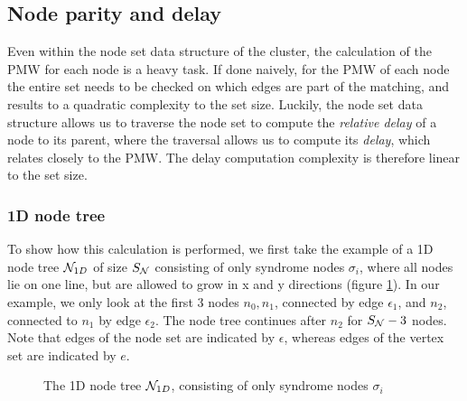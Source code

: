\subsection{Node parity and delay}\label{sec:nodedelay}

Even within the node set data structure of the cluster, the calculation of the PMW for each node is a heavy task. If done naively, for the PMW of each node the entire set needs to be checked on which edges are part of the matching, and results to a quadratic complexity to the set size. Luckily, the node set data structure allows us to traverse the node set to compute the \emph{relative delay} of a node to its parent, where the traversal allows us to compute its \emph{delay}, which relates closely to the PMW. The delay computation complexity is therefore linear to the set size.

\subsubsection{1D node tree}
To show how this calculation is performed, we first take the example of a 1D node tree $\mathcal{N}_{1D}$ of size $S_{\mathcal{N}}$ consisting of only syndrome nodes $\sigma_i$, where all nodes lie on one line, but are allowed to grow in x and y directions (figure \ref{fig:1dnodetree}). In our example, we only look at the first 3 nodes $n_0, n_1$, connected by edge $\epsilon_{1}$, and $n_2$, connected to $n_1$ by edge $\epsilon_{2}$. The node tree continues after $n_2$ for $S_{\mathcal{N}} - 3$ nodes. Note that edges of the node set are indicated by $\epsilon$, whereas edges of the vertex set are indicated by $e$.

\begin{figure}[h]
  \centering
  \caption{The 1D node tree $\mathcal{N}_{1D}$, consisting of only syndrome nodes $\sigma_i$}\label{fig:1dnodetree}
\end{figure}

